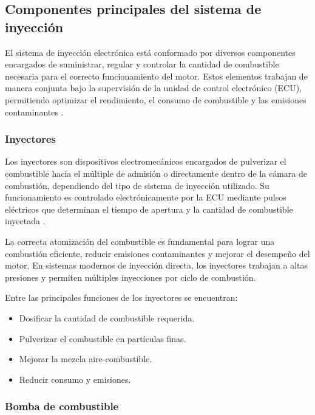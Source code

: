 \subsection{Componentes principales del sistema de inyección}%


El sistema de inyección electrónica está conformado por diversos componentes encargados de suministrar, regular y controlar la cantidad de combustible necesaria para el correcto funcionamiento del motor. Estos elementos trabajan de manera conjunta bajo la supervisión de la unidad de control electrónico (ECU), permitiendo optimizar el rendimiento, el consumo de combustible y las emisiones contaminantes \citep{Bosch_Automotive, Bosch_GDI}.

\subsubsection{Inyectores}

Los inyectores son dispositivos electromecánicos encargados de pulverizar el combustible hacia el múltiple de admisión o directamente dentro de la cámara de combustión, dependiendo del tipo de sistema de inyección utilizado. Su funcionamiento es controlado electrónicamente por la ECU mediante pulsos eléctricos que determinan el tiempo de apertura y la cantidad de combustible inyectada \citep{Bosch_GDI}.

La correcta atomización del combustible es fundamental para lograr una combustión eficiente, reducir emisiones contaminantes y mejorar el desempeño del motor. En sistemas modernos de inyección directa, los inyectores trabajan a altas presiones y permiten múltiples inyecciones por ciclo de combustión.

Entre las principales funciones de los inyectores se encuentran:
\begin{itemize}
    \item Dosificar la cantidad de combustible requerida.
    \item Pulverizar el combustible en partículas finas.
    \item Mejorar la mezcla aire-combustible.
    \item Reducir consumo y emisiones.
\end{itemize}

\subsubsection{Bomba de combustible}

